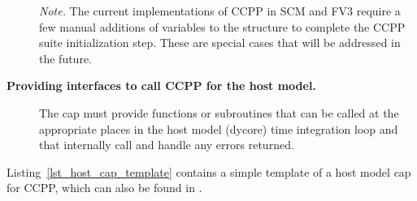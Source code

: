 \begin{description}
\emph{Note.} The current implementations of CCPP in SCM and FV3 require a few manual additions of variables to the  structure to complete the CCPP suite initialization step. These are special cases that will be addressed in the future.
\item[\textbf{Providing interfaces to call CCPP for the host model.}] The cap must provide functions or subroutines that can be called at the appropriate places in the host model (dycore) time integration loop and that internally call  and handle any errors returned.
\end{description}
Listing~\ref{lst_host_cap_template} contains a simple template of a host model cap for CCPP, which can also be found in .
\begin{figure}

\end{figure}

